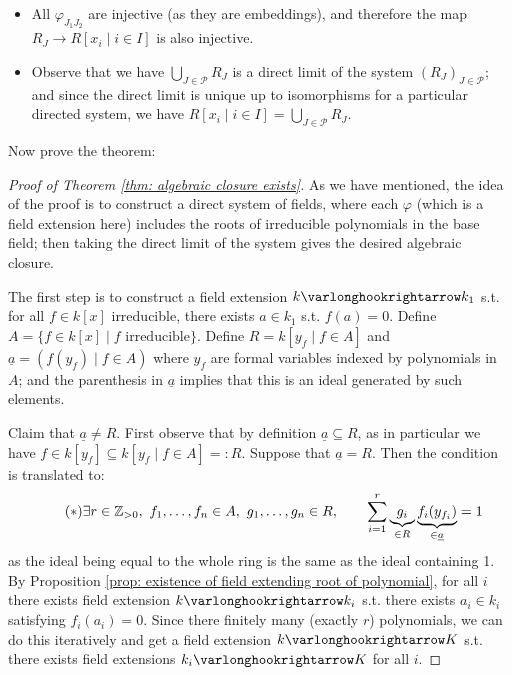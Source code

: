 \documentclass{article}
\begin{document}
\begin{itemize}
    \item All $\varphi_{J_1 J_2}$ are injective (as they are embeddings), and therefore the map $R_J \to R[x_i \mid i \in I]$ is also injective.
    \item Observe that we have $\bigcup_{J \in \mathcal{P}} R_J$ is a direct limit of the system $(R_J)_{J \in \mathcal{P}}$; and since the direct limit is unique up to isomorphisms for a particular directed system, we have $R[x_i \mid i \in I] = \bigcup_{J \in \mathcal{P}} R_J$.
\end{itemize}

Now prove the theorem:

\begin{proof}[Proof of Theorem \ref{thm: algebraic closure exists}]
    As we have mentioned, the idea of the proof is to construct a direct system of fields, where each $\varphi$ (which is a field extension here) includes the roots of irreducible polynomials in the base field; then taking the direct limit of the system gives the desired algebraic closure. 

    The first step is to construct a field extension $k \ext k_1$ s.t. for all $f \in k[x]$ irreducible, there exists $a \in k_1$ s.t. $f(a) = 0$. Define $A = \{ f \in k[x] \mid f \text{ irreducible} \}$. Define $R = k[y_f \mid f \in A]$ and $\underline{a} = (f(y_f) \mid f \in A)$ where $y_f$ are formal variables indexed by polynomials in $A$; and the parenthesis in $\underline{a}$ implies that this is an ideal generated by such elements. 

    Claim that $\underline{a} \neq R$. First observe that by definition $\underline{a} \subseteq R$, as in particular we have $f \in k[y_f] \subseteq k[y_f \mid f \in A] =: R$. Suppose that $\underline{a} = R$. Then the condition is translated to:
    \begin{equation}\label{eq: condition if a_ = R}
        \tag{$\ast$}        
        \exists r \in \mathbb{Z}_{>0},\ f_1, \dots, f_n \in A,\ g_1, \dots, g_n \in R, \qquad \sum_{i = 1}^r \underbrace{g_i}_{\in R} \underbrace{f_i (y_{f_i})} _{\in \underline{a}} = 1
    \end{equation}
    as the ideal being equal to the whole ring is the same as the ideal containing 1. By Proposition \ref{prop: existence of field extending root of polynomial}, for all $i$ there exists field extension $k \ext k_i$ s.t. there exists $a_i \in k_i$ satisfying $f_i(a_i) = 0$. Since there finitely many (exactly $r$) polynomials, we can do this iteratively and get a field extension $k \ext K$ s.t. there exists field extensions $k_i \ext K$ for all $i$.


\end{proof}
\end{document}
